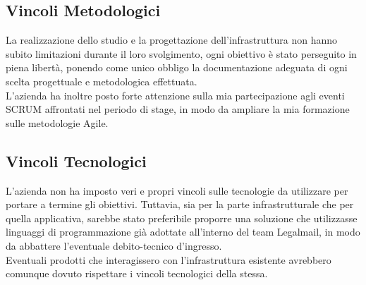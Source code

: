 \subsection{Vincoli Metodologici}
La realizzazione dello studio e la progettazione dell'infrastruttura non hanno subito limitazioni durante il loro svolgimento, ogni obiettivo è stato perseguito in piena libertà, ponendo come unico obbligo la documentazione adeguata di ogni scelta progettuale e metodologica effettuata. \\
L'azienda ha inoltre posto forte attenzione sulla mia partecipazione agli eventi SCRUM affrontati nel periodo di stage, in modo da ampliare la mia formazione sulle metodologie Agile.
\subsection{Vincoli Tecnologici}
L'azienda non ha imposto veri e propri vincoli sulle tecnologie da utilizzare per portare a termine gli obiettivi. Tuttavia, sia per la parte infrastrutturale che per quella applicativa, sarebbe stato preferibile proporre una soluzione che utilizzasse linguaggi di programmazione già adottate all'interno del team Legalmail, in modo da abbattere l'eventuale \gls{debito-tecnico} d'ingresso. \\
Eventuali prodotti che interagissero con l'infrastruttura esistente avrebbero comunque dovuto rispettare i vincoli tecnologici della stessa. 
